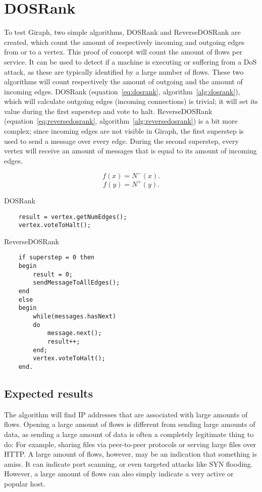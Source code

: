 \chapter{DOSRank}
\label{chp:dosrank}

To test Giraph, two simple algorithms, DOSRank and ReverseDOSRank are created, which count the amount of respectively incoming and outgoing edges from or to a vertex.
This proof of concept will count the amount of flows per \gls{service}.
It can be used to detect if a machine is executing or suffering from a DoS attack,
 as these are typically identified by a large number of flows.
These two algorithms will count respectively the amount of outgoing and the amount of incoming edges.
DOSRank (equation~\ref{eq:dosrank}, algorithm~\ref{alg:dosrank}), which will calculate outgoing edges (incoming connections) is trivial; it will set its value during the first superstep and vote to halt.
ReverseDOSRank (equation~\ref{eq:reversedosrank}, algorithm~\ref{alg:reversedosrank}) is a bit more complex;
 since incoming edges are not visible in Giraph, the first superstep is used to send a message over every edge.
During the second superstep, every vertex will receive an amount of messages that is equal to its amount of incoming edges.


\begin{equation}
	\label{eq:dosrank}
	f(x) = N^{-}(x).
\end{equation}
\begin{equation}
	\label{eq:reversedosrank}
	f(y) = N^{+}(y).
\end{equation}

\begin{algorithm}[H]
	\label{alg:dosrank}
	\caption{DOSRank}
	\begin{verbatim}
	result = vertex.getNumEdges();
	vertex.voteToHalt();
	\end{verbatim}
\end{algorithm}
\begin{algorithm}[H]
	\label{alg:reversedosrank}
	\caption{ReverseDOSRank}
	\begin{verbatim}
	if superstep = 0 then
	begin
	    result = 0;
	    sendMessageToAllEdges();
	end
	else
	begin
	    while(messages.hasNext)
	    do
	        message.next();
	        result++;
	    end;
	    vertex.voteToHalt();
	end.
	\end{verbatim}
\end{algorithm}

\section{Expected results}
The algorithm will find IP addresses that are associated with large amounts of flows.
Opening a large amount of flows is different from sending large amounts of data,
 as sending a large amount of data is often a completely legitimate thing to do:
For example, sharing files via peer-to-peer protocols or serving large files over HTTP.
A large amount of flows, however, may be an indication that something is amiss.
It can indicate port scanning, or even targeted attacks like SYN flooding.
However, a large amount of flows can also simply indicate a very active or popular host.

